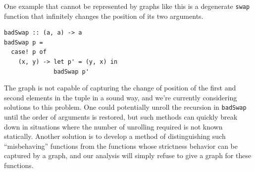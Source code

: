 \documentclass{article}
\begin{document}
One example that cannot be represented by graphs like this is a
degenerate \verb|swap| function that infinitely changes the position
of its two arguments.

\begin{verbatim}
badSwap :: (a, a) -> a
badSwap p =
  case! p of
    (x, y) -> let p' = (y, x) in
              badSwap p'
\end{verbatim}

The graph is not capable of capturing the change of position of the
first and second elements in the tuple in a sound way, and we're
currently considering solutions to this problem. One could potentially
unroll the recursion in \verb|badSwap| until the order of arguments is
restored, but such methods can quickly break down in situations where
the number of unrolling required is not known statically. Another
solution is to develop a method of distinguishing such ``misbehaving''
functions from the functions whose strictness behavior can be captured
by a graph, and our analysis will simply refuse to give a graph for
these functions.
\end{document}
